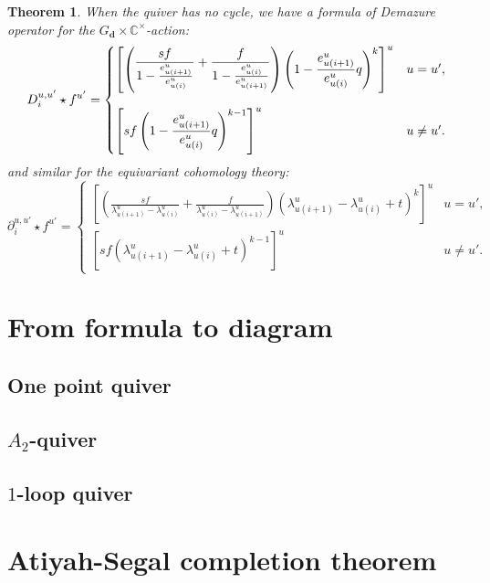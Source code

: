 \documentclass[reqno,11pt]{book}
\numberwithin{equation}{section}
\theoremstyle{plain}
\newtheorem{theorem}{Theorem}[section]
\theoremstyle{plain}
\numberwithin{equation}{section}
\theoremstyle{remark}
\newcommand{\dimvec}[1]{\mathbf{#1}}
\begin{document}
\begin{theorem}
When the quiver has no cycle, we have a formula of Demazure operator for the $G_{\dimvec{d}} \times \mathbb{C}^{\times}$-action:
\begin{equation*}\label{eq:Demazure_operator_C*action}
D_i^{u,u'} \star f^{u'}=\begin{cases}
\left[\left( \raisebox{2mm}{$\displaystyle\frac{sf}{ 1-\frac{e_{u(i+1)}^{u}}{e_{u(i)}^{u}}}     + \frac{f}{1-\frac{e_{u(i)}^{u}}{e_{u(i+1)}^{u}}}$}  \right)\left(\displaystyle 1-\frac{e_{u(i+1)}^{u}}{e_{u(i)}^{u}} q\right)^{k} \right]^{u} & u=u',\\[8mm]
\left[sf  \left(\displaystyle 1-\frac{e_{u(i+1)}^{u}}{e_{u(i)}^{u}} q\right)^{k-1} \right]^{u} & u \neq u'.
\end{cases}
\end{equation*}
and similar for the equivariant cohomology theory:
\begin{equation*}\label{eq:Demazure_operator_cth_C*action}
\partial_i^{u,u'} \star f^{u'}=\begin{cases}
\left[\left( \displaystyle\frac{sf}{ \lambda_{u(i+1)}^{u}-\lambda_{u(i)}^{u}}     + \frac{f}{\lambda_{u(i)}^{u}-\lambda_{u(i+1)}^{u} }  \right)\left(\lambda_{u(i+1)}^{u}-\lambda_{u(i)}^{u} +t \right)^{k} \right]^{u} & u=u',\\[8mm]
\left[sf  \left(\lambda_{u(i+1)}^{u}-\lambda_{u(i)}^{u} +t\right)^{k-1} \right]^{u} & u \neq u'.
\end{cases}
\end{equation*}
\end{theorem}
\section{From formula to diagram}\label{sec:diagram}

\subsection{One point quiver}
\subsection{$A_2$-quiver}
\subsection{$1$-loop quiver}


\section{Atiyah-Segal completion theorem}\label{sec:AScompletion}




\end{document}
